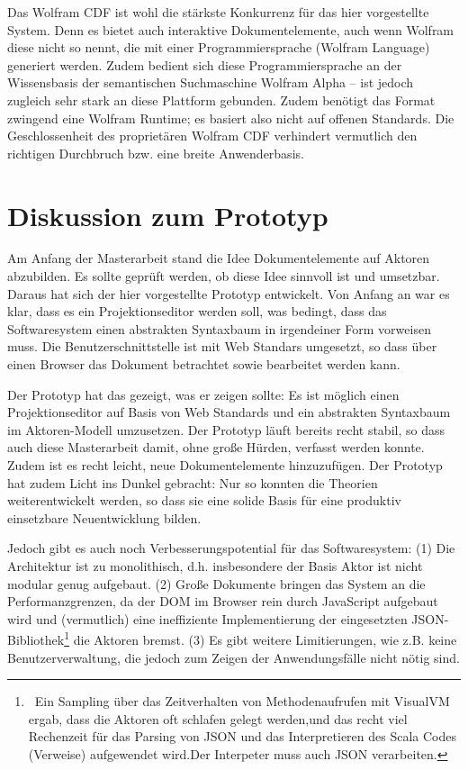 
Das Wolfram CDF ist wohl die stärkste Konkurrenz für das hier vorgestellte System. Denn es bietet auch interaktive Dokumentelemente, auch wenn Wolfram diese nicht so nennt, die mit einer Programmiersprache (Wolfram Language) generiert werden. Zudem bedient sich diese Programmiersprache an der Wissensbasis der semantischen Suchmaschine Wolfram Alpha -- ist jedoch zugleich sehr stark an diese Plattform gebunden. Zudem benötigt das Format zwingend eine Wolfram Runtime; es basiert also nicht auf offenen Standards. Die Geschlossenheit des proprietären Wolfram CDF verhindert vermutlich den richtigen Durchbruch bzw. eine breite Anwenderbasis.

 
\section{Diskussion zum Prototyp}\label{}
 
Am Anfang der Masterarbeit stand die Idee Dokumentelemente auf Aktoren abzubilden. Es sollte geprüft werden, ob diese Idee sinnvoll ist und umsetzbar. Daraus hat sich der hier vorgestellte Prototyp entwickelt. Von Anfang an war es klar, dass es ein Projektionseditor werden soll, was bedingt, dass das Softwaresystem einen abstrakten Syntaxbaum in irgendeiner Form vorweisen muss. Die Benutzerschnittstelle ist mit Web Standars umgesetzt, so dass über einen Browser das Dokument betrachtet sowie bearbeitet werden kann.

 
Der Prototyp hat das gezeigt, was er zeigen sollte: Es ist möglich einen Projektionseditor auf Basis von Web Standards und ein abstrakten Syntaxbaum im Aktoren-Modell umzusetzen. Der Prototyp läuft bereits recht stabil, so dass auch diese Masterarbeit damit, ohne große Hürden, verfasst werden konnte. Zudem ist es recht leicht, neue Dokumentelemente hinzuzufügen. Der Prototyp hat zudem Licht ins Dunkel gebracht: Nur so konnten die Theorien weiterentwickelt werden, so dass sie eine solide Basis für eine produktiv einsetzbare Neuentwicklung bilden.

 
Jedoch gibt es auch noch Verbesserungspotential für das Softwaresystem: (1) Die Architektur ist zu monolithisch, d.h. insbesondere der Basis Aktor ist nicht modular genug aufgebaut. (2) Große Dokumente bringen das System an die Performanzgrenzen, da der DOM im Browser rein durch JavaScript aufgebaut wird und (vermutlich) eine ineffiziente Implementierung der eingesetzten JSON-Bibliothek\footnote{~Ein Sampling über das Zeitverhalten von Methodenaufrufen mit VisualVM ergab, dass die Aktoren oft schlafen gelegt werden,und das recht viel Rechenzeit für das Parsing von JSON und das Interpretieren des Scala Codes (Verweise) aufgewendet wird.Der Interpeter muss auch JSON verarbeiten.} die Aktoren bremst. (3) Es gibt weitere Limitierungen, wie z.B. keine Benutzerverwaltung, die jedoch zum Zeigen der Anwendungsfälle nicht nötig sind.

